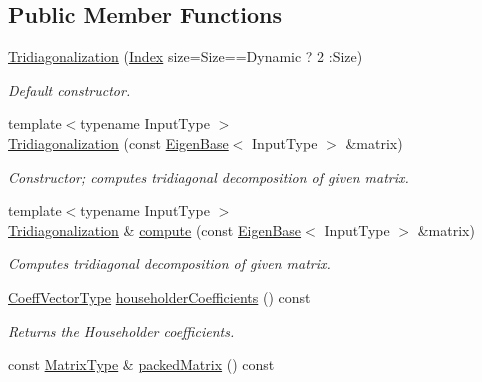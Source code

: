 \subsection*{Public Member Functions}
\begin{DoxyCompactItemize}
\item 
\mbox{\hyperlink{class_eigen_1_1_tridiagonalization_a9ea2e6154bf35494ee68e037f0867cbd}{Tridiagonalization}} (\mbox{\hyperlink{class_eigen_1_1_tridiagonalization_a7bd1f9fccec1e93b77a2214b2d30aae9}{Index}} size=Size==Dynamic ? 2 \+:Size)
\begin{DoxyCompactList}\small\item\em Default constructor. \end{DoxyCompactList}\item 
{\footnotesize template$<$typename Input\+Type $>$ }\\\mbox{\hyperlink{class_eigen_1_1_tridiagonalization_a05406b7df9a92fdcba72d31443f67a98}{Tridiagonalization}} (const \mbox{\hyperlink{struct_eigen_1_1_eigen_base}{Eigen\+Base}}$<$ Input\+Type $>$ \&matrix)
\begin{DoxyCompactList}\small\item\em Constructor; computes tridiagonal decomposition of given matrix. \end{DoxyCompactList}\item 
{\footnotesize template$<$typename Input\+Type $>$ }\\\mbox{\hyperlink{class_eigen_1_1_tridiagonalization}{Tridiagonalization}} \& \mbox{\hyperlink{class_eigen_1_1_tridiagonalization_acd288abb081d3b40b87e4b98cd8f6ee9}{compute}} (const \mbox{\hyperlink{struct_eigen_1_1_eigen_base}{Eigen\+Base}}$<$ Input\+Type $>$ \&matrix)
\begin{DoxyCompactList}\small\item\em Computes tridiagonal decomposition of given matrix. \end{DoxyCompactList}\item 
\mbox{\hyperlink{class_eigen_1_1_matrix}{Coeff\+Vector\+Type}} \mbox{\hyperlink{class_eigen_1_1_tridiagonalization_ac95b4e43dcf6c3c5074b8bea4fc67887}{householder\+Coefficients}} () const
\begin{DoxyCompactList}\small\item\em Returns the Householder coefficients. \end{DoxyCompactList}\item 
const \mbox{\hyperlink{class_eigen_1_1_tridiagonalization_add0f4b2216d0ea8ee0f7d8525deaf0a9}{Matrix\+Type}} \& \mbox{\hyperlink{class_eigen_1_1_tridiagonalization_a47858b3895e64acafb1bb2e97f98a154}{packed\+Matrix}} () const

\end{DoxyCompactItemize}
